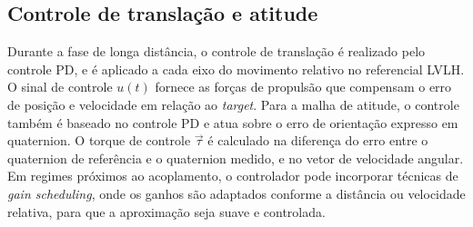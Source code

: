 \subsection{Controle de translação e atitude}

Durante a fase de longa distância, o controle de translação é realizado pelo controle PD, e é aplicado a cada eixo do movimento relativo no referencial LVLH.  
O sinal de controle $u(t)$ fornece as forças de propulsão que compensam o erro de posição e velocidade em relação ao \emph{target}.  
Para a malha de atitude, o controle também é baseado no controle PD e atua sobre o erro de orientação expresso em quaternion.  
O torque de controle $\vec{\tau}$ é calculado na diferença do erro entre o quaternion de referência e o quaternion medido, e no vetor de velocidade angular.  
Em regimes próximos ao acoplamento, o controlador pode incorporar técnicas de \emph{gain scheduling}, onde os ganhos são adaptados conforme a distância ou velocidade relativa, para que a aproximação seja suave e controlada.